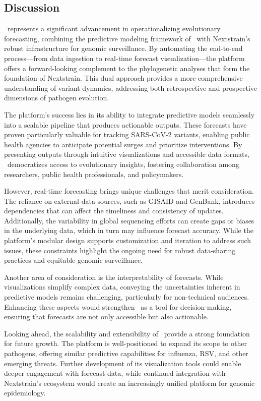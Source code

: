 \subsection{Discussion}

\forecastsNcov\ represents a significant advancement in operationalizing evolutionary forecasting, combining the predictive modeling framework of \evofr\ with Nextstrain’s robust infrastructure for genomic surveillance.
By automating the end-to-end process—from data ingestion to real-time forecast visualization—the platform offers a forward-looking complement to the phylogenetic analyses that form the foundation of Nextstrain.
This dual approach provides a more comprehensive understanding of variant dynamics, addressing both retrospective and prospective dimensions of pathogen evolution.

The platform’s success lies in its ability to integrate predictive models seamlessly into a scalable pipeline that produces actionable outputs.
These forecasts have proven particularly valuable for tracking SARS-CoV-2 variants, enabling public health agencies to anticipate potential surges and prioritize interventions.
By presenting outputs through intuitive visualizations and accessible data formats, \forecastsNcov\ democratizes access to evolutionary insights, fostering collaboration among researchers, public health professionals, and policymakers.

However, real-time forecasting brings unique challenges that merit consideration.
The reliance on external data sources, such as GISAID and GenBank, introduces dependencies that can affect the timeliness and consistency of updates.
Additionally, the variability in global sequencing efforts can create gaps or biases in the underlying data, which in turn may influence forecast accuracy.
While the platform’s modular design supports customization and iteration to address such issues, these constraints highlight the ongoing need for robust data-sharing practices and equitable genomic surveillance.

Another area of consideration is the interpretability of forecasts.
While visualizations simplify complex data, conveying the uncertainties inherent in predictive models remains challenging, particularly for non-technical audiences.
Enhancing these aspects would strengthen \forecastsNcov\ as a tool for decision-making, ensuring that forecasts are not only accessible but also actionable.

Looking ahead, the scalability and extensibility of \forecastsNcov\ provide a strong foundation for future growth.
The platform is well-positioned to expand its scope to other pathogens, offering similar predictive capabilities for influenza, RSV, and other emerging threats.
Further development of its visualization tools could enable deeper engagement with forecast data, while continued integration with Nextstrain’s ecosystem would create an increasingly unified platform for genomic epidemiology.

